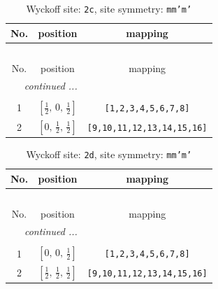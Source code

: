 \documentclass[fleqn,8pt]{jsarticle}
\begin{document}
\renewcommand{\arraystretch}{1.2}
\begin{longtable}{ccc}
\caption{Wyckoff site: {\tt 2c}, site symmetry: {\tt mm'm'}}
 \\
 \hline \hline
No. & position & mapping \\ \hline \endfirsthead

\multicolumn{2}{l}{\tablename\ \thetable{}} \\
 \hline \hline
No. & position & mapping \\ \hline \endhead

 \hline \hline
\multicolumn{2}{r}{\footnotesize\it continued ...} \\ \endfoot

 \hline \hline
\multicolumn{2}{r}{} \\ \endlastfoot

1 & $\left[ \frac{1}{2},\, 0,\, \frac{1}{2} \right]$ & {\tt [1,2,3,4,5,6,7,8]} \\ \hline
2 & $\left[ 0,\, \frac{1}{2},\, \frac{1}{2} \right]$ & {\tt [9,10,11,12,13,14,15,16]} \\
\end{longtable}
\renewcommand{\arraystretch}{1.2}
\begin{longtable}{ccc}
\caption{Wyckoff site: {\tt 2d}, site symmetry: {\tt mm'm'}}
 \\
 \hline \hline
No. & position & mapping \\ \hline \endfirsthead

\multicolumn{2}{l}{\tablename\ \thetable{}} \\
 \hline \hline
No. & position & mapping \\ \hline \endhead

 \hline \hline
\multicolumn{2}{r}{\footnotesize\it continued ...} \\ \endfoot

 \hline \hline
\multicolumn{2}{r}{} \\ \endlastfoot

1 & $\left[ 0,\, 0,\, \frac{1}{2} \right]$ & {\tt [1,2,3,4,5,6,7,8]} \\ \hline
2 & $\left[ \frac{1}{2},\, \frac{1}{2},\, \frac{1}{2} \right]$ & {\tt [9,10,11,12,13,14,15,16]} \\
\end{longtable}
\renewcommand{\arraystretch}{1.2}
\end{document}
